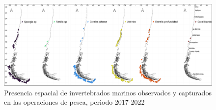\documentclass[
  super,
  preprint,
  3p]{elsarticle}
\begin{document}
\begin{figure}

{\centering \includegraphics{mapa.png}

}

\caption{Presencia espacial de invertebrados marinos observados y
capturados en las operaciones de pesca, periodo 2017-2022}

\end{figure}


  
\end{document}
